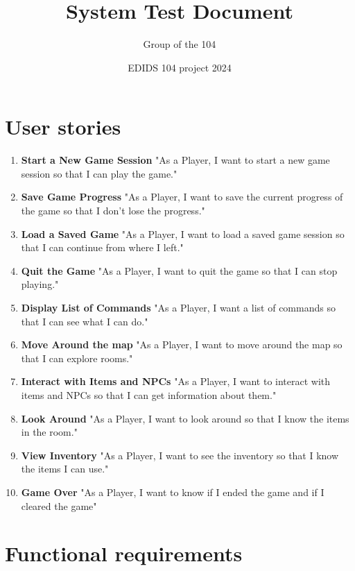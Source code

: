 \documentclass{article}
\title{\textbf{System Test Document}}
\author{Group of the 104}
\date{EDIDS 104 project 2024}
\begin{document}
\maketitle

\section{User stories}

\begin{enumerate}
    \item \textbf{Start a New Game Session}
"As a Player, I want to start a new game session so that I can play the game."

    \item \textbf{Save Game Progress}
"As a Player, I want to save the current progress of the game so that I don’t lose the progress."

    \item \textbf{Load a Saved Game}
"As a Player, I want to load a saved game session so that I can continue from where I left."

    \item \textbf{Quit the Game}
"As a Player, I want to quit the game so that I can stop playing."

    \item \textbf{Display List of Commands}
"As a Player, I want a list of commands so that I can see what I can do."

    \item \textbf{Move Around the map}
"As a Player, I want to move around the map so that I can explore rooms."

    \item \textbf{Interact with Items and NPCs}
"As a Player, I want to interact with items and NPCs so that I can get information about them."

    \item \textbf{Look Around}
"As a Player, I want to look around so that I know the items in the room."

    \item \textbf{View Inventory}
"As a Player, I want to see the inventory so that I know the items I can use."

\item \textbf{Game Over}
"As a Player, I want to know if I ended the game and if I cleared the game"

\end{enumerate}

 
\section{Functional requirements}
\end{document}
